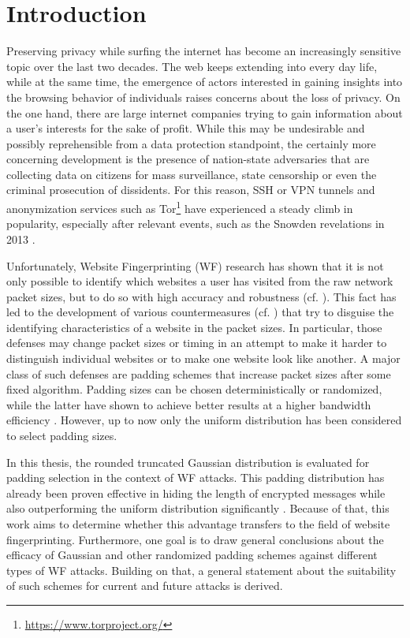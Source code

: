 \documentclass[
	ruledheaders=chapter,
	class=report,
	thesis={type=master, department=inf},
	accentcolor=1c,
	custommargins=true,
	marginpar=false,
	parskip=half-,
	fontsize=11pt,
]{tudapub}
\begin{document}
	\tableofcontents
	
	\chapter{Introduction}
	\label{introduction}

	Preserving privacy while surfing the internet has become an increasingly sensitive topic over the last two decades. The web keeps extending into every day life, while at the same time, the emergence of actors interested in gaining insights into the browsing behavior of individuals raises concerns about the loss of privacy. On the one hand, there are large internet companies trying to gain information about a user's interests for the sake of profit. While this may be undesirable and possibly reprehensible from a data protection standpoint, the certainly more concerning development is the presence of nation-state adversaries that are collecting data on citizens for mass surveillance, state censorship or even the criminal prosecution of dissidents. For this reason, SSH or VPN tunnels and anonymization services such as Tor\footnote{\url{https://www.torproject.org/}} have experienced a steady climb in popularity, especially after relevant events, such as the Snowden revelations in 2013 \cite{TorHistory}.
	
	Unfortunately, Website Fingerprinting (WF) research has shown that it is not only possible to identify which websites a user has visited from the raw network packet sizes, but to do so with high accuracy and robustness (cf. \cite{Liberatore2006,Herrmann2009,Panchenko2011,Dyer2012,Wang2014,Panchenko2016,Hayes2016,Sirinam2018,Wang2021}). This fact has led to the development of various countermeasures (cf. \cite{Wright2009,Dyer2012,Cai2014,Cai2014a,Juarez2016,Luo2021}) that try to disguise the identifying characteristics of a website in the packet sizes. In particular, those defenses may change packet sizes or timing in an attempt to make it harder to distinguish individual websites or to make one website look like another. A major class of such defenses are padding schemes that increase packet sizes after some fixed algorithm. Padding sizes can be chosen deterministically or randomized, while the latter have shown to achieve better results at a higher bandwidth efficiency \cite{Dyer2012}. However, up to now only the uniform distribution has been considered to select padding sizes.
	
	In this thesis, the rounded truncated Gaussian distribution is evaluated for padding selection in the context of WF attacks. This padding distribution has already been proven effective in hiding the length of encrypted messages while also outperforming the uniform distribution significantly \cite{Degabriele2021}. Because of that, this work aims to determine whether this advantage transfers to the field of website fingerprinting. Furthermore, one goal is to draw general conclusions about the efficacy of Gaussian and other randomized padding schemes against different types of WF attacks. Building on that, a general statement about the suitability of such schemes for current and future attacks is derived.
	
\end{document}
